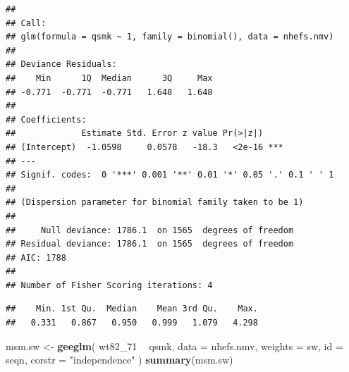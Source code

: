 \documentclass[
  10pt,
]{book}
\newenvironment{Shaded}{\begin{snugshade}}{\end{snugshade}}
\newcommand{\DataTypeTok}[1]{\textcolor[rgb]{0.13,0.29,0.53}{#1}}
\newcommand{\DecValTok}[1]{\textcolor[rgb]{0.00,0.00,0.81}{#1}}
\newcommand{\KeywordTok}[1]{\textcolor[rgb]{0.13,0.29,0.53}{\textbf{#1}}}
\newcommand{\NormalTok}[1]{#1}
\newcommand{\OperatorTok}[1]{\textcolor[rgb]{0.81,0.36,0.00}{\textbf{#1}}}
\newcommand{\StringTok}[1]{\textcolor[rgb]{0.31,0.60,0.02}{#1}}
\begin{document}
\begin{verbatim}
## 
## Call:
## glm(formula = qsmk ~ 1, family = binomial(), data = nhefs.nmv)
## 
## Deviance Residuals: 
##    Min      1Q  Median      3Q     Max  
## -0.771  -0.771  -0.771   1.648   1.648  
## 
## Coefficients:
##             Estimate Std. Error z value Pr(>|z|)    
## (Intercept)  -1.0598     0.0578   -18.3   <2e-16 ***
## ---
## Signif. codes:  0 '***' 0.001 '**' 0.01 '*' 0.05 '.' 0.1 ' ' 1
## 
## (Dispersion parameter for binomial family taken to be 1)
## 
##     Null deviance: 1786.1  on 1565  degrees of freedom
## Residual deviance: 1786.1  on 1565  degrees of freedom
## AIC: 1788
## 
## Number of Fisher Scoring iterations: 4
\end{verbatim}

\begin{Shaded}
\end{Shaded}

\begin{verbatim}
##    Min. 1st Qu.  Median    Mean 3rd Qu.    Max. 
##   0.331   0.867   0.950   0.999   1.079   4.298
\end{verbatim}

\begin{Shaded}
\begin{Highlighting}[]
\NormalTok{msm.sw <-}\StringTok{ }\KeywordTok{geeglm}\NormalTok{(}
\NormalTok{  wt82_}\DecValTok{71} \OperatorTok{~}\StringTok{ }\NormalTok{qsmk,}
  \DataTypeTok{data =}\NormalTok{ nhefs.nmv,}
  \DataTypeTok{weights =}\NormalTok{ sw,}
  \DataTypeTok{id =}\NormalTok{ seqn,}
  \DataTypeTok{corstr =} \StringTok{"independence"}
\NormalTok{)}
\KeywordTok{summary}\NormalTok{(msm.sw)}
\end{Highlighting}
\end{Shaded}
\end{document}
